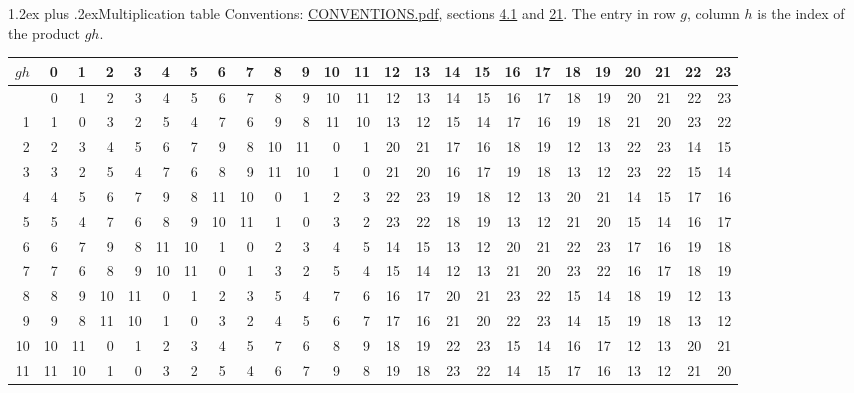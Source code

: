 \documentclass[10pt,a4paper]{article}
\makeatletter
\renewcommand\section{\@startsection{section}{1}{\z@}{-3ex plus -1ex minus -.2ex}%
  {1.2ex plus .2ex}{\normalfont\large\sffamily\bfseries\color{parttitle}}}
\numberwithin{equation}{section}
\makeatother
\begin{document}
\section{Multiplication table}\label{s:multiplication}
Conventions: \href{../../CONVENTIONS.pdf}{CONVENTIONS.pdf}, sections \href{../../../rotation/CONVENTIONS.pdf\#conv.4.1}{4.1} and \href{../../CONVENTIONS.pdf\#conv.21}{21}.
The entry in row $g$, column $h$ is the index of the product $gh$.
{\normalsize\setlength{\tabcolsep}{0.1em}\setlength{\LTleft}{-8pt plus 1fill}\setlength{\LTright}{-8pt plus 1fill}\begin{longtable}{@{}r|rrrrrrrrrrrrrrrrrrrrrrrr@{}}\toprule
$gh$ & 0 & 1 & 2 & 3 & 4 & 5 & 6 & 7 & 8 & 9 & 10 & 11 & 12 & 13 & 14 & 15 & 16 & 17 & 18 & 19 & 20 & 21 & 22 & 23\\\midrule\endhead
\bottomrule\endfoot\endlastfoot
0 & 0 & 1 & 2 & 3 & 4 & 5 & 6 & 7 & 8 & 9 & 10 & 11 & 12 & 13 & 14 & 15 & 16 & 17 & 18 & 19 & 20 & 21 & 22 & 23\\*
1 & 1 & 0 & 3 & 2 & 5 & 4 & 7 & 6 & 9 & 8 & 11 & 10 & 13 & 12 & 15 & 14 & 17 & 16 & 19 & 18 & 21 & 20 & 23 & 22\\
2 & 2 & 3 & 4 & 5 & 6 & 7 & 9 & 8 & 10 & 11 & 0 & 1 & 20 & 21 & 17 & 16 & 18 & 19 & 12 & 13 & 22 & 23 & 14 & 15\\
3 & 3 & 2 & 5 & 4 & 7 & 6 & 8 & 9 & 11 & 10 & 1 & 0 & 21 & 20 & 16 & 17 & 19 & 18 & 13 & 12 & 23 & 22 & 15 & 14\\
4 & 4 & 5 & 6 & 7 & 9 & 8 & 11 & 10 & 0 & 1 & 2 & 3 & 22 & 23 & 19 & 18 & 12 & 13 & 20 & 21 & 14 & 15 & 17 & 16\\
5 & 5 & 4 & 7 & 6 & 8 & 9 & 10 & 11 & 1 & 0 & 3 & 2 & 23 & 22 & 18 & 19 & 13 & 12 & 21 & 20 & 15 & 14 & 16 & 17\\
6 & 6 & 7 & 9 & 8 & 11 & 10 & 1 & 0 & 2 & 3 & 4 & 5 & 14 & 15 & 13 & 12 & 20 & 21 & 22 & 23 & 17 & 16 & 19 & 18\\
7 & 7 & 6 & 8 & 9 & 10 & 11 & 0 & 1 & 3 & 2 & 5 & 4 & 15 & 14 & 12 & 13 & 21 & 20 & 23 & 22 & 16 & 17 & 18 & 19\\
8 & 8 & 9 & 10 & 11 & 0 & 1 & 2 & 3 & 5 & 4 & 7 & 6 & 16 & 17 & 20 & 21 & 23 & 22 & 15 & 14 & 18 & 19 & 12 & 13\\
9 & 9 & 8 & 11 & 10 & 1 & 0 & 3 & 2 & 4 & 5 & 6 & 7 & 17 & 16 & 21 & 20 & 22 & 23 & 14 & 15 & 19 & 18 & 13 & 12\\
10 & 10 & 11 & 0 & 1 & 2 & 3 & 4 & 5 & 7 & 6 & 8 & 9 & 18 & 19 & 22 & 23 & 15 & 14 & 16 & 17 & 12 & 13 & 20 & 21\\
11 & 11 & 10 & 1 & 0 & 3 & 2 & 5 & 4 & 6 & 7 & 9 & 8 & 19 & 18 & 23 & 22 & 14 & 15 & 17 & 16 & 13 & 12 & 21 & 20\\

\end{longtable}}
\end{document}
